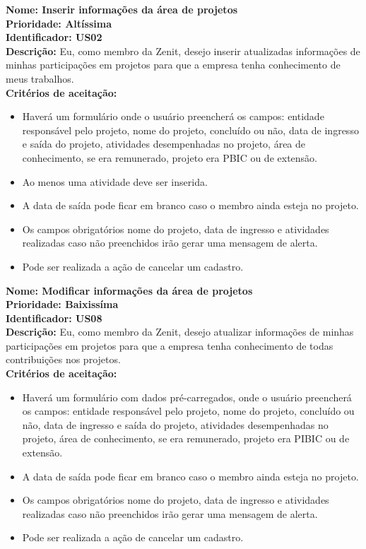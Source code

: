 \begin{anexosenv}
\textbf{Nome: Inserir informações da área de projetos\\
    Prioridade: Altíssima\\
    Identificador: US02\\
    Descrição:} Eu, como membro da Zenit, desejo inserir atualizadas informações de minhas participações em projetos para que a empresa tenha conhecimento de meus trabalhos.\\
\textbf{Critérios de aceitação:}
\begin{itemize}
    \item Haverá um formulário onde o usuário preencherá os campos: entidade responsável pelo projeto, nome do projeto, concluído ou não, data de ingresso e saída do projeto, atividades desempenhadas no projeto, área de conhecimento, se era remunerado, projeto era PBIC ou de extensão.
    \item Ao menos uma atividade deve ser inserida.
    \item A data de saída pode ficar em branco caso o membro ainda esteja no projeto.
    \item Os campos obrigatórios nome do projeto, data de ingresso e atividades realizadas caso não preenchidos irão gerar uma mensagem de alerta.
    \item Pode ser realizada a ação de cancelar um cadastro.
\end{itemize}

\textbf{Nome: Modificar informações da área de projetos\\
    Prioridade: Baixissíma\\
    Identificador: US08\\
    Descrição:} Eu, como membro da Zenit, desejo atualizar informações de minhas participações em projetos para que a empresa tenha conhecimento de todas contribuições nos projetos.\\
\textbf{Critérios de aceitação:}
\begin{itemize}
    \item Haverá um formulário com dados pré-carregados, onde o usuário preencherá os campos: entidade responsável pelo projeto, nome do projeto, concluído ou não, data de ingresso e saída do projeto, atividades desempenhadas no projeto, área de conhecimento, se era remunerado, projeto era PIBIC ou de extensão.
    \item A data de saída pode ficar em branco caso o membro ainda esteja no projeto.
    \item Os campos obrigatórios nome do projeto, data de ingresso e atividades realizadas caso não preenchidos irão gerar uma mensagem de alerta.
    \item Pode ser realizada a ação de cancelar um cadastro.
\end{itemize}


\end{anexosenv}
